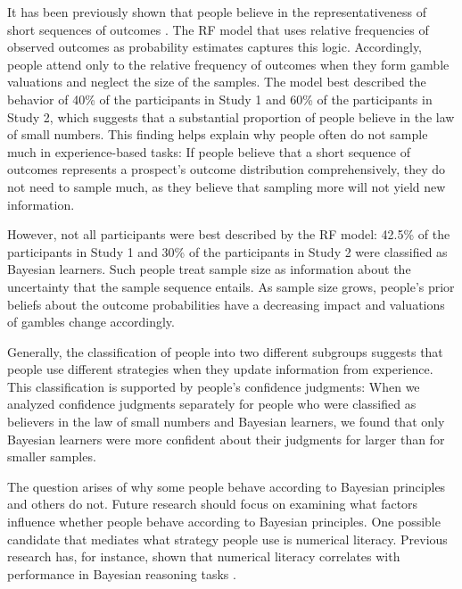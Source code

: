 \documentclass[a4paper,man, natbib]{apa6} %
\begin{document}
It has been previously shown that people believe in the representativeness of short sequences of outcomes \citep{Griffin1992, Tversky1971}. The RF model that uses relative frequencies of observed outcomes as probability estimates captures this logic. Accordingly, people attend  only to the relative frequency of outcomes when they form gamble valuations and neglect the size of the samples. The model best described the behavior of 40\% of the participants in Study 1 and 60\% of the participants in Study 2, which suggests that a substantial proportion of people believe in the law of small numbers. This finding helps explain why people often do not sample much in experience-based tasks: If people believe that a short sequence of outcomes represents a prospect's outcome distribution comprehensively, they do not need to sample much, as they believe that sampling more will not yield new information. 

However, not all participants were best described by the RF model: 42.5\% of the participants in Study 1 and 30\% of the participants in Study 2 were classified as Bayesian learners. Such people treat sample size as information about the uncertainty that the sample sequence entails. As sample size grows, people's prior beliefs about the outcome probabilities have a decreasing impact and valuations of gambles change accordingly. 

Generally, the classification of people into two different subgroups suggests that people use different strategies when they update information from experience. 
This classification is supported by people's confidence judgments: When we analyzed confidence judgments separately for people who were classified as believers in the law of small numbers and Bayesian learners, we found that only Bayesian learners were more confident about their judgments for larger than for smaller samples. 


The question arises of why some people behave according to Bayesian principles and others do not. Future research should focus on examining what factors influence whether people behave according to Bayesian principles. One possible candidate that mediates what strategy people use is numerical literacy. Previous research has, for instance, shown that numerical literacy correlates with performance in Bayesian reasoning tasks \citep{Brase2017}. 
\end{document}

